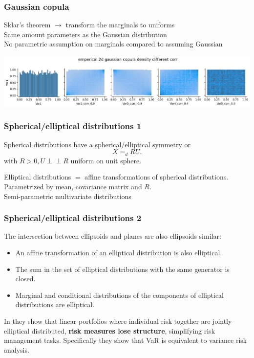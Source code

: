 \documentclass[18pt,aspectratio=149]{beamer}
\begin{document}
\begin{frame}
    \frametitle{Gaussian copula}
    Sklar's theorem $\rightarrow$ transform the marginals to uniforms \\
    Same amount parameters as the Gaussian distribution \\
    No parametric assumption on marginals compared to assuming Gaussian

    \begin{center}
        \includegraphics[width=\textwidth]{gaussian_copula.png}
    \end{center}

\end{frame}


\begin{frame}
    \frametitle{Spherical/elliptical distributions 1}
    Spherical distributions have a spherical/elliptical symmetry or\\
    \begin{equation}
        X =_{d} R U
        .
    \end{equation}
    with $R>0,U\perp\!\!\!\perp R$ uniform on unit sphere. \\
    \pause

    Elliptical distributions $=$ affine transformations of spherical distributions. \\
    \pause
    Parametrized by mean, covariance matrix and $R$. \\
    Semi-parametric multivariate distributions
\end{frame}

\begin{frame}
    \frametitle{Spherical/elliptical distributions 2}
    The intersection between ellipsoids and planes are also ellipsoids similar:
    \pause
    \begin{itemize}
        \item An affine transformation of an elliptical distribution is also elliptical.
        \item The sum in the set of elliptical distributions with the same generator is closed.
        \item Marginal and conditional  distributions of the components of elliptical distributions are elliptical.
    \end{itemize}
    \pause
    \vspace{0.5cm}
    In \cite{dempster_correlation_2002} they show that linear portfolios where individual risk together are jointly elliptical
    distributed, \textbf{risk measures lose structure}, simplifying risk management tasks. Specifically they show that VaR is equivalent
    to variance risk analysis.
\end{frame}
\end{document}
